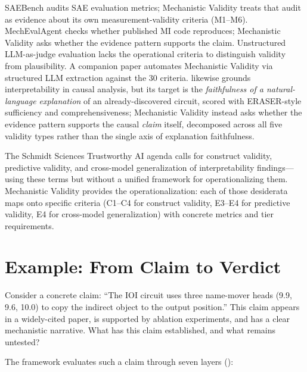 \documentclass{article}
\begin{document}
SAEBench \citep{karvonen2025saebench} audits SAE evaluation metrics; Mechanistic Validity treats that audit as evidence about its own measurement-validity criteria (M1--M6). MechEvalAgent \citep{bai2026mecheval} checks whether published MI code reproduces; Mechanistic Validity asks whether the evidence pattern supports the claim. Unstructured LLM-as-judge evaluation \citep{zheng2023judging} lacks the operational criteria to distinguish validity from plausibility. A companion paper automates Mechanistic Validity via structured LLM extraction against the 30 criteria. \citet{mahale2026causally} likewise grounds interpretability in causal analysis, but its target is the \emph{faithfulness of a natural-language explanation} of an already-discovered circuit, scored with ERASER-style sufficiency and comprehensiveness; Mechanistic Validity instead asks whether the evidence pattern supports the causal \emph{claim} itself, decomposed across all five validity types rather than the single axis of explanation faithfulness.

The Schmidt Sciences Trustworthy AI agenda \citep{schmidt2026trustworthy} calls for construct validity, predictive validity, and cross-model generalization of interpretability findings---using these terms but without a unified framework for operationalizing them. Mechanistic Validity provides the operationalization: each of those desiderata maps onto specific criteria (C1--C4 for construct validity, E3--E4 for predictive validity, E4 for cross-model generalization) with concrete metrics and tier requirements.



\section{Example: From Claim to Verdict}
\label{sec:overview}

Consider a concrete claim: ``The IOI circuit uses three name-mover heads (9.9, 9.6, 10.0) to copy the indirect object to the output position.'' This claim appears in a widely-cited paper, is supported by ablation experiments, and has a clear mechanistic narrative. What has this claim established, and what remains untested?

The framework evaluates such a claim through seven layers ():
\end{document}
